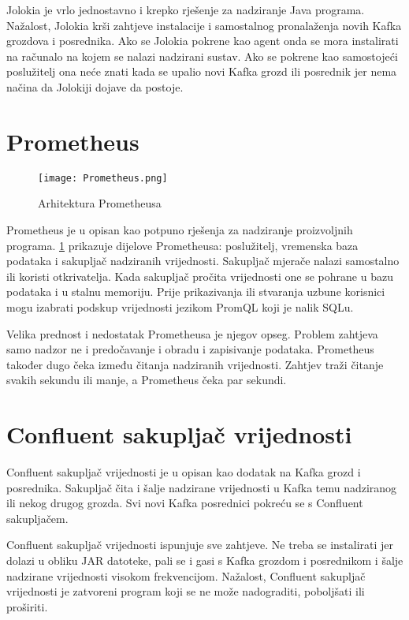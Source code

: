 \documentclass[times, utf8, diplomski, numeric]{fer}
\begin{document}
Jolokia je vrlo jednostavno i krepko rješenje za nadziranje Java programa. Nažalost, Jolokia krši zahtjeve instalacije i samostalnog pronalaženja novih Kafka grozdova i posrednika. Ako se Jolokia pokrene kao agent onda se mora instalirati na računalo na kojem se nalazi nadzirani sustav. Ako se pokrene kao samostojeći poslužitelj ona neće znati kada se upalio novi Kafka grozd ili posrednik jer nema načina da Jolokiji dojave da postoje.

\section{Prometheus}

\begin{figure}[H]
    \centering
    \texttt{[image: Prometheus.png]}
    \caption{Arhitektura Prometheusa}
    \label{fig:prometheus}
\end{figure}

Prometheus je u \citep{prometheus} opisan kao potpuno rješenja za nadziranje proizvoljnih programa. \ref{fig:prometheus} prikazuje dijelove Prometheusa: poslužitelj, vremenska baza podataka i sakupljač nadziranih vrijednosti. Sakupljač mjerače nalazi samostalno ili koristi otkrivatelja. Kada sakupljač pročita vrijednosti one se pohrane u bazu podataka i u stalnu memoriju. Prije prikazivanja ili stvaranja uzbune korisnici mogu izabrati podskup vrijednosti jezikom PromQL koji je nalik SQLu.

Velika prednost i nedostatak Prometheusa je njegov opseg. Problem zahtjeva samo nadzor ne i predočavanje i obradu i zapisivanje podataka. Prometheus također dugo čeka između čitanja nadziranih vrijednosti. Zahtjev traži čitanje svakih sekundu ili manje, a Prometheus čeka par sekundi.

\section{Confluent sakupljač vrijednosti}

Confluent sakupljač vrijednosti je u \citep{confluent-metrics-reporter} opisan kao dodatak na Kafka grozd i posrednika. Sakupljač čita i šalje nadzirane vrijednosti u Kafka temu nadziranog ili nekog drugog grozda. Svi novi Kafka posrednici pokreću se s Confluent sakupljačem.

Confluent sakupljač vrijednosti ispunjuje sve zahtjeve. Ne treba se instalirati jer dolazi u obliku JAR datoteke, pali se i gasi s Kafka grozdom i posrednikom i šalje nadzirane vrijednosti visokom frekvencijom. Nažalost, Confluent sakupljač vrijednosti je zatvoreni program koji se ne može nadograditi, poboljšati ili proširiti.
\end{document}
